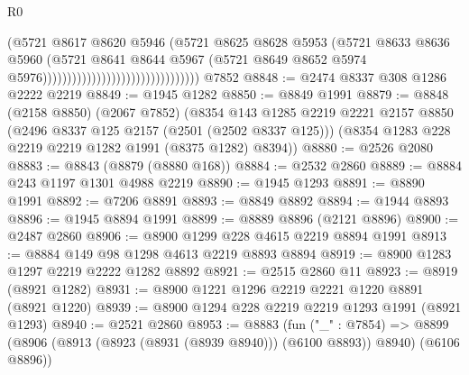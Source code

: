 \begin{lexlean}{R0}
\begin{coremodule}
                                                          (@5721
                                                            @8617
                                                            @8620
                                                            @5946
                                                            (@5721
                                                              @8625
                                                              @8628
                                                              @5953
                                                              (@5721
                                                                @8633
                                                                @8636
                                                                @5960
                                                                (@5721
                                                                  @8641
                                                                  @8644
                                                                  @5967
                                                                  (@5721
                                                                    @8649
                                                                    @8652
                                                                    @5974
                                                                    @5976))))))))))))))))))))))))))))))))
    @7852
@8848 := @2474 @8337 @308 @1286 @2222 @2219
@8849 := @1945 @1282
@8850 := @8849 @1991
@8879 := @8848
    (@2158 @8850)
    (@2067 @7852)
    (@8354
      @143
      @1285
      @2219
      @2221
      @2157
      @8850
      (@2496 @8337 @125 @2157 (@2501 (@2502 @8337 @125)))
      (@8354 @1283 @228 @2219 @2219 @1282 @1991 (@8375 @1282) @8394))
@8880 := @2526 @2080
@8883 := @8843 (@8879 (@8880 @168))
@8884 := @2532 @2860
@8889 := @8884 @243 @1197 @1301 @4988 @2219
@8890 := @1945 @1293
@8891 := @8890 @1991
@8892 := @7206 @8891
@8893 := @8849 @8892
@8894 := @1944 @8893
@8896 := @1945 @8894 @1991
@8899 := @8889 @8896 (@2121 @8896)
@8900 := @2487 @2860
@8906 := @8900 @1299 @228 @4615 @2219 @8894 @1991
@8913 := @8884 @149 @98 @1298 @4613 @2219 @8893 @8894
@8919 := @8900 @1283 @1297 @2219 @2222 @1282 @8892
@8921 := @2515 @2860 @11
@8923 := @8919 (@8921 @1282)
@8931 := @8900 @1221 @1296 @2219 @2221 @1220 @8891 (@8921 @1220)
@8939 := @8900 @1294 @228 @2219 @2219 @1293 @1991 (@8921 @1293)
@8940 := @2521 @2860
@8953 := @8883
    (fun ("_" : @7854) =>
    @8899 (@8906 (@8913 (@8923 (@8931 (@8939 @8940))) (@6100 @8893)) @8940) (@6106 @8896))

\end{coremodule}
\end{lexlean}
